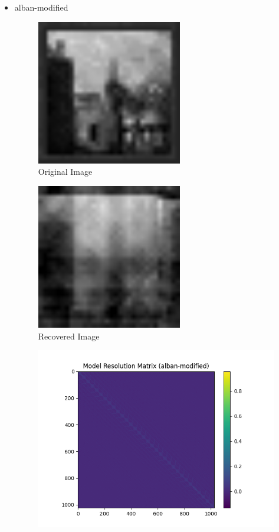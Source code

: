 \documentclass{article}
\begin{document}
\begin{itemize}
    \item alban-modified
\begin{figure}[h]
    \centering
    \includegraphics[width=0.6\textwidth]{images/greyscale/alban-modified.png}
    \caption{Original Image}
\end{figure}
\begin{figure}[h]
    \centering
    \includegraphics[width=0.6\textwidth]{images/outputs/alban-modified.png}
    \caption{Recovered Image}
\end{figure}
\begin{figure}[h]
    \centering
    \includegraphics[width=1\textwidth]{images/outputs/modelres/alban-modified.png}

\end{figure}
\end{itemize}
\end{document}

